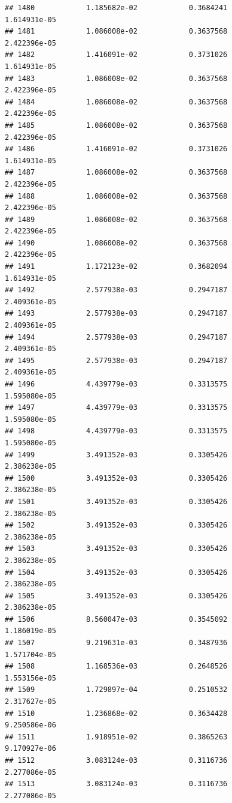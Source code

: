 \documentclass[
]{article}
\begin{document}
\begin{verbatim}
## 1480            1.185682e-02            0.3684241            1.614931e-05
## 1481            1.086008e-02            0.3637568            2.422396e-05
## 1482            1.416091e-02            0.3731026            1.614931e-05
## 1483            1.086008e-02            0.3637568            2.422396e-05
## 1484            1.086008e-02            0.3637568            2.422396e-05
## 1485            1.086008e-02            0.3637568            2.422396e-05
## 1486            1.416091e-02            0.3731026            1.614931e-05
## 1487            1.086008e-02            0.3637568            2.422396e-05
## 1488            1.086008e-02            0.3637568            2.422396e-05
## 1489            1.086008e-02            0.3637568            2.422396e-05
## 1490            1.086008e-02            0.3637568            2.422396e-05
## 1491            1.172123e-02            0.3682094            1.614931e-05
## 1492            2.577938e-03            0.2947187            2.409361e-05
## 1493            2.577938e-03            0.2947187            2.409361e-05
## 1494            2.577938e-03            0.2947187            2.409361e-05
## 1495            2.577938e-03            0.2947187            2.409361e-05
## 1496            4.439779e-03            0.3313575            1.595080e-05
## 1497            4.439779e-03            0.3313575            1.595080e-05
## 1498            4.439779e-03            0.3313575            1.595080e-05
## 1499            3.491352e-03            0.3305426            2.386238e-05
## 1500            3.491352e-03            0.3305426            2.386238e-05
## 1501            3.491352e-03            0.3305426            2.386238e-05
## 1502            3.491352e-03            0.3305426            2.386238e-05
## 1503            3.491352e-03            0.3305426            2.386238e-05
## 1504            3.491352e-03            0.3305426            2.386238e-05
## 1505            3.491352e-03            0.3305426            2.386238e-05
## 1506            8.560047e-03            0.3545092            1.186019e-05
## 1507            9.219631e-03            0.3487936            1.571704e-05
## 1508            1.168536e-03            0.2648526            1.553156e-05
## 1509            1.729897e-04            0.2510532            2.317627e-05
## 1510            1.236868e-02            0.3634428            9.250586e-06
## 1511            1.918951e-02            0.3865263            9.170927e-06
## 1512            3.083124e-03            0.3116736            2.277086e-05
## 1513            3.083124e-03            0.3116736            2.277086e-05

\end{verbatim}
\end{document}
